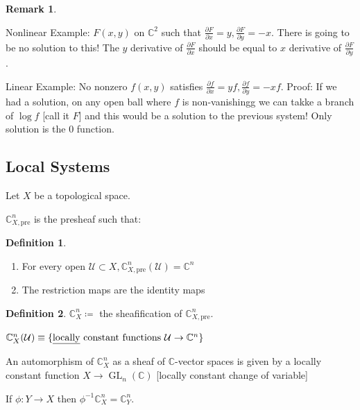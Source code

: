 \documentclass{article}
\theoremstyle{definition}
\newtheorem*{definition}{Definition}
\newtheorem*{remark}{Remark}
\begin{document}
\begin{remark}
\begin{itemize}
            Nonlinear Example: \(F(x,y)\) on \(\mathbb{C}^2\) such that \(\frac{\partial F}{\partial x} = y, \frac{\partial F}{\partial y} = -x\). There is going to be no solution to this! The \(y\) derivative of \(\frac{\partial F}{\partial x}\) should be equal to \(x\) derivative of \(\frac{\partial F}{\partial y}\).

            Linear Example: No nonzero \(f(x,y)\) satisfies \(\frac{\partial f}{\partial x} = yf, \frac{\partial f}{\partial y} = - xf\). Proof: If we had a solution, on any open ball where \(f\) is non-vanishingg we can takke a branch of \(\log f\) [call it \(F\)] and this would be a solution to the previous system! Only solution is the \(0\) function.
        \end{itemize} 
    \end{remark}

    \subsection*{Local Systems}

    Let \(X\) be a topological space.

    \(\mathbb{C}^n_{X,\text{pre}}\) is the presheaf such that:

    \begin{definition}
        \begin{enumerate}[label=\roman*)]
            \item For every open \(\mathcal{U} \subset X, \mathbb{C}^n_{X,\text{pre}}(\mathcal{U}) = \mathbb{C}^n\)
            \item The restriction maps are the identity maps  
        \end{enumerate} 
    \end{definition}

    \begin{definition}
        \(\mathbb{C}^n_X\coloneqq\) the sheafification of \(\mathbb{C}^n_{X,\text{pre}}\).
        
        \(\mathbb{C}^n_X(\mathcal{U}) \equiv  \{ \text{\underline{locally} constant functions } \mathcal{U} \to \mathbb{C}^n \}\) 
    \end{definition}

    An automorphism of \(\mathbb{C}_X^n\) as a sheaf of \(\mathbb{C}\)-vector spaces is given by a locally constant function \(X \to \operatorname{GL}_n(\mathbb{C})\) [locally constant change of variable] 

    If \(\phi: Y \to X\) then \(\phi ^{-1} \mathbb{C}_X^n = \mathbb{C}_Y^n\). 
\end{document}
